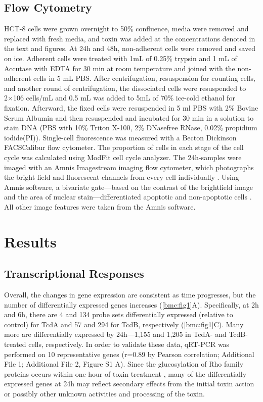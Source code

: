 \subsection{Flow Cytometry}
HCT-8 cells were grown overnight to 50\% confluence, media were removed and replaced with fresh media, and toxin was added at the concentrations denoted in the text and figures. At 24h and 48h, non-adherent cells were removed and saved on ice. Adherent cells were treated with 1mL of 0.25\% trypsin and 1 mL of Accutase with EDTA for 30 min at room temperature and joined with the non-adherent cells in 5 mL PBS. After centrifugation, resuspension for counting cells, and another round of centrifugation, the dissociated cells were resuspended to 2×106 cells/mL and 0.5 mL was added to 5mL of 70\% ice-cold ethanol for fixation. Afterward, the fixed cells were resuspended in 5 ml PBS with 2\% Bovine Serum Albumin and then resuspended and incubated for 30 min in a solution to stain DNA (PBS with 10\% Triton X-100, 2\% DNasefree RNase, 0.02\% propidium iodide(PI)). Single-cell fluorescence was measured with a Becton Dickinson FACSCalibur flow cytometer. The proportion of cells in each stage of the cell cycle was calculated using ModFit cell cycle analyzer. The 24h-samples were imaged with an Amnis Imagestream imaging flow cytometer, which photographs the bright field and fluorescent channels from every cell individually \cite{George:2004jj}. Using Amnis software, a bivariate gate—based on the contrast of the brightfield image and the area of nuclear stain—differentiated apoptotic and non-apoptotic cells \cite{Henery:2008jz}. All other image features were taken from the Amnis software.

\section{Results}

\subsection{Transcriptional Responses}

Overall, the changes in gene expression are consistent as time progresses, but the number of differentially expressed genes increases (\autoref{bmc:fig1}A). Specifically, at 2h and 6h, there are 4 and 134 probe sets differentially expressed (relative to control) for TcdA and 57 and 294 for TcdB, respectively (\autoref{bmc:fig1}C).  Many more are differentially expressed by 24h—1,155 and 1,205 in TcdA- and TcdB-treated cells, respectively. In order to validate these data, qRT-PCR was performed on 10 representative genes (r=0.89 by Pearson correlation; Additional File 1; Additional File 2, Figure S1 A). Since the glucosylation of Rho family proteins occurs within one hour of toxin treatment \cite{ChavesOlarte:1997cs}, many of the differentially expressed genes at 24h may reflect secondary effects from the initial toxin action or possibly other unknown activities and processing of the toxin.

